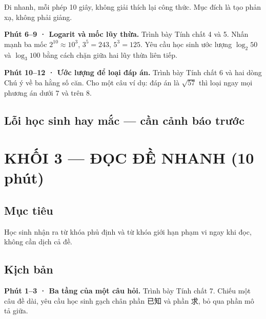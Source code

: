\documentclass[11pt, a4paper]{article}
\begin{document}
Đi nhanh, mỗi phép 10 giây, không giải thích lại công thức. Mục đích là tạo phản xạ, không phải giảng.

\textbf{Phút 6–9 · Logarit và mốc lũy thừa.} Trình bày Tính chất 4 và 5. Nhấn mạnh ba mốc $2^{10} \approx 10^3$, $3^5 = 243$, $5^3 = 125$. Yêu cầu học sinh ước lượng $\log_2 50$ và $\log_3 100$ bằng cách chặn giữa hai lũy thừa liên tiếp.

\textbf{Phút 10–12 · Ước lượng để loại đáp án.} Trình bày Tính chất 6 và hai dòng Chú ý về ba hằng số căn. Cho một câu ví dụ: đáp án là $\sqrt{57}$ thì loại ngay mọi phương án dưới $7$ và trên $8$.

\subsection{Lỗi học sinh hay mắc — cần cảnh báo trước}


\section{KHỐI 3 — ĐỌC ĐỀ NHANH (10 phút)}

\subsection{Mục tiêu}

Học sinh nhận ra từ khóa phủ định và từ khóa giới hạn phạm vi ngay khi đọc, không cần dịch cả đề.

\subsection{Kịch bản}

\textbf{Phút 1–3 · Ba tầng của một câu hỏi.} Trình bày Tính chất 7. Chiếu một câu đề dài, yêu cầu học sinh gạch chân phần 已知 và phần 求, bỏ qua phần mô tả giữa.
\end{document}
